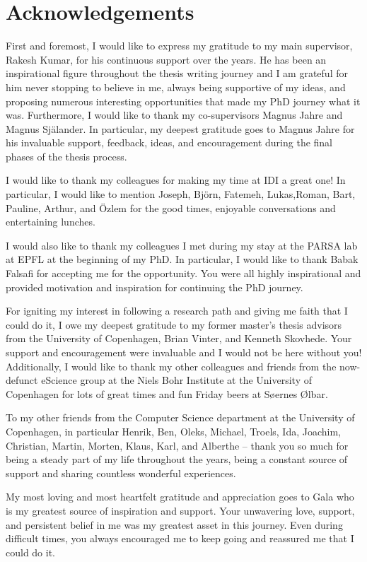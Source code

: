 \documentclass[../main.tex]{subfiles}
\begin{document}
\chapter{Acknowledgements}

First and foremost, I would like to express my gratitude to my main
supervisor, Rakesh Kumar, for his continuous support over the
years. He has been an inspirational figure throughout the thesis
writing journey and I am grateful for him never stopping to believe in
me, always being supportive of my ideas, and proposing numerous
interesting opportunities that made my PhD journey what it
was. Furthermore, I would like to thank my co-supervisors Magnus Jahre
and Magnus Själander. In particular, my deepest gratitude goes to
Magnus Jahre for his invaluable support, feedback, ideas, and
encouragement during the final phases of the thesis process.

I would like to thank my colleagues for making my time at IDI a great
one! In particular, I would like to mention Joseph, Björn, Fatemeh,
Lukas,Roman, Bart, Pauline, Arthur, and Özlem for the good times,
enjoyable conversations and entertaining lunches.

I would also like to thank my colleagues I met during my stay at the
PARSA lab at EPFL at the beginning of my PhD. In particular, I would
like to thank Babak Falsafi for accepting me for the opportunity. You
were all highly inspirational and provided motivation and inspiration
for continuing the PhD journey.

For igniting my interest in following a research path and giving me
faith that I could do it, I owe my deepest gratitude to my former
master's thesis advisors from the University of Copenhagen, Brian
Vinter, and Kenneth Skovhede. Your support and encouragement were
invaluable and I would not be here without you! Additionally, I would
like to thank my other colleagues and friends from the now-defunct
eScience group at the Niels Bohr Institute at the University of
Copenhagen for lots of great times and fun Friday beers at Søernes
Ølbar.

To my other friends from the Computer Science department at the
University of Copenhagen, in particular Henrik, Ben, Oleks, Michael,
Troels, Ida, Joachim, Christian, Martin, Morten, Klaus, Karl, and
Alberthe -- thank you so much for being a steady part of my life
throughout the years, being a constant source of support and sharing
countless wonderful experiences.

My most loving and most heartfelt gratitude and appreciation goes to
Gala who is my greatest source of inspiration and support. Your
unwavering love, support, and persistent belief in me was my greatest
asset in this journey. Even during difficult times, you always
encouraged me to keep going and reassured me that I could do it.
\end{document}
